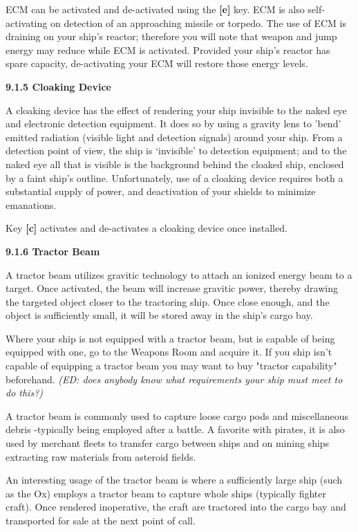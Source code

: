 \documentclass{article}
\begin{document}
ECM can be activated and de-activated using the \textbf{[e] }key. ECM is also self-activating on detection of an approaching missile or torpedo. The use of ECM is draining on your ship's reactor; therefore you will note that weapon and jump energy may reduce while ECM is activated. Provided your ship's reactor has spare capacity, de-activating your ECM will restore those energy levels. 

\textbf{9.1.5 Cloaking Device }

A cloaking device has the effect of rendering your ship invisible to the naked eye and electronic detection equipment. It does so by using a gravity lens to 'bend' emitted radiation (visible light and detection signals) around your ship. From a detection point of view, the ship is `invisible' to detection equipment; and to the naked eye all that is visible is the background behind the cloaked ship, enclosed by a faint ship's outline. Unfortunately, use of a cloaking device requires both a substantial supply of power, and deactivation of your shields to minimize emanations. 

Key \textbf{[c]} activates and de-activates a cloaking device once installed. 

\textbf{9.1.6 Tractor Beam }

A tractor beam utilizes gravitic technology to attach an ionized energy beam to a target. Once activated, the beam will increase gravitic power, thereby drawing the targeted object closer to the tractoring ship. Once close enough, and the object is sufficiently small, it will be stored away in the ship's cargo bay. 

Where your ship is not equipped with a tractor beam, but is capable of being equipped with one, go to the Weapons Room and acquire it. If you ship isn't capable of equipping a tractor beam you may want to buy "tractor capability" beforehand. \textit{(ED: does anybody know what requirements your ship must meet to do this?) }

A tractor beam is commonly used to capture loose cargo pods and miscellaneous debris -typically being employed after a battle. A favorite with pirates, it is also used by merchant fleets to transfer cargo between ships and on mining ships extracting raw materials from asteroid fields. 

An interesting usage of the tractor beam is where a sufficiently large ship (such as the Ox) employs a tractor beam to capture whole ships (typically fighter craft). Once rendered inoperative, the craft are tractored into the cargo bay and transported for sale at the next point of call. 
\end{document}
